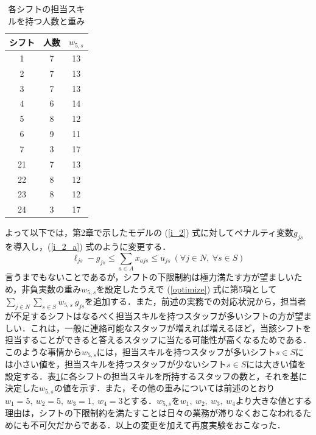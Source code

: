 \documentclass[11pt]{jsarticle}
\begin{document}
\begin{table}[htb]
  \begin{center}
    \caption{各シフトの担当スキルを持つ人数と重み}
    \label{tab:shift_can_num}
    \begin{tabular}{ccc}
      \hline \hline
      シフト & 人数 & $w_{5,s}$ \\ \hline
      1 & 7 & 13 \\
      2 & 7 & 13 \\
      3 & 7 & 13 \\
      4 & 6 & 14 \\
      5 & 8 & 12 \\
      6 & 9 & 11\\
      7 & 3 & 17\\
      21& 7 & 13 \\
      22 & 8 & 12 \\
      23 & 8 & 12 \\
      24 & 3 & 17\\ \hline \hline
    \end{tabular}
  \end{center}
\end{table}
よって以下では，第2章で示したモデルの (\ref{i_2}) 式に対してペナルティ変数$g_{js}$を導入し，(\ref{i_2_a}) 式のように変更する．
\begin{equation}
\ell_{js} - g_{js} \leq \sum_{a \in A} x_{ajs} \leq u_{js} \ (\forall j \in N, \ \forall s \in S)
\label{i_2_a}
\end{equation}
言うまでもないことであるが，シフトの下限制約は極力満たす方が望ましいため，非負実数の重み$w_{5,s}$を設定したうえで (\ref{optimize}) 式に第5項として $\displaystyle \sum_{j \in N} \sum_{s \in S} w_{5,s} \ g_{js} $を追加する．また，前述の実務での対応状況から，担当者が不足するシフトはなるべく担当スキルを持つスタッフが多いシフトの方が望ましい．これは，一般に連絡可能なスタッフが増えれば増えるほど，当該シフトを担当することができると答えるスタッフに当たる可能性が高くなるためである．このような事情から$w_{5,s}$には，担当スキルを持つスタッフが多いシフト$s \in S$には小さい値を，担当スキルを持つスタッフが少ないシフト$s \in S$には大きい値を設定する．表\ref{tab:shift_can_num}に各シフトの担当スキルを所持するスタッフの数と，それを基に決定した$w_{5,s}$の値を示す．また，その他の重みについては前述のとおり$w_1 = 5, \ w_2 = 5, \ w_3 = 1, \ w_4 = 3$とする．$w_{5,s}$を$w_1, \ w_2, \ w_3, \ w_4$より大きな値とする理由は，シフトの下限制約を満たすことは日々の業務が滞りなくおこなわれるためにも不可欠だからである．以上の変更を加えて再度実験をおこなった．
\end{document}

